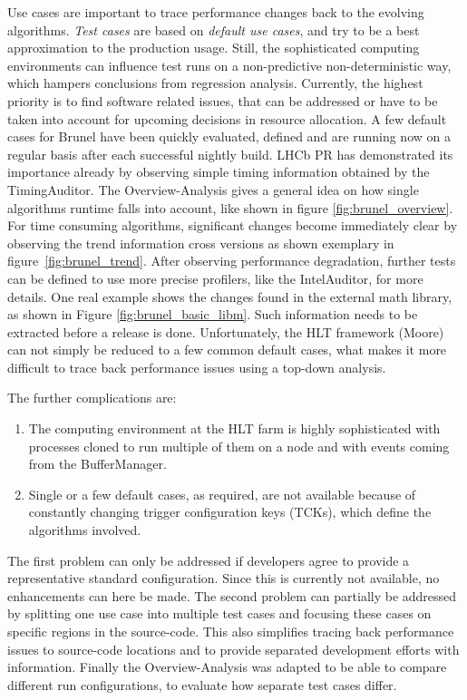\documentclass[a4paper]{jpconf}
\begin{document}
Use cases are important to trace performance changes back to the evolving algorithms. \textit{Test cases} are based on \textit{default use cases}, and try to be a best approximation to the production usage. Still, the sophisticated computing environments can influence test runs on a non-predictive non-deterministic way, which hampers conclusions from regression analysis. Currently, the highest priority is to find software related issues, that can be addressed or have to be taken into account for upcoming decisions in resource allocation.
\newline
A few default cases for Brunel have been quickly evaluated, defined and are running now on a regular basis after each successful nightly build. LHCb PR has demonstrated its importance already by observing simple timing information obtained by the TimingAuditor. The Overview-Analysis gives a general idea on how single algorithms runtime falls into account, like shown in figure \ref{fig:brunel_overview}. For time consuming algorithms, significant changes become immediately clear by observing the trend information cross versions as shown exemplary in \mbox{figure \ref{fig:brunel_trend}}. After observing performance degradation, further tests can be defined to use more precise profilers, like the IntelAuditor, for more details. One real example shows the changes found in the external math library, as shown in Figure \ref{fig:brunel_basic_libm}. Such information needs to be extracted before a release is done. 
\newline
Unfortunately, the HLT framework (Moore) can not simply be reduced to a few common default cases, what makes it more difficult to trace back performance issues using a top-down analysis.

\newpage

The further complications are:
\begin{enumerate}
 \item The computing environment at the HLT farm is highly sophisticated with processes cloned to run multiple of them on a node and with events coming from the BufferManager.
 \item Single or a few default cases, as required, are not available because of constantly changing trigger configuration keys (TCKs), which define the algorithms involved.
\end{enumerate}
The first problem can only be addressed if developers agree to provide a representative standard configuration. Since this is currently not available, no enhancements can here be made. The second problem can partially be addressed by splitting one use case into multiple test cases and focusing these cases on specific regions in the source-code. This also simplifies tracing back performance issues to source-code locations and to provide separated development efforts with information. Finally the Overview-Analysis was adapted to be able to compare different run configurations, to evaluate how separate test cases differ.
\end{document}

